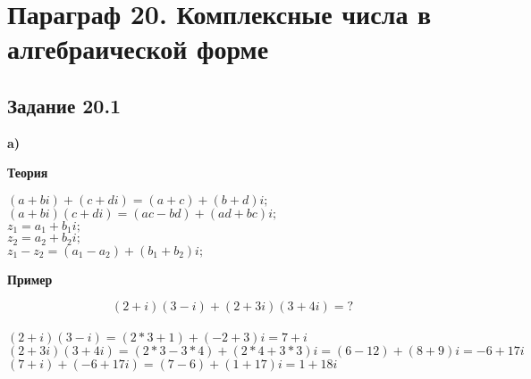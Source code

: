 \documentclass{article}
\begin{document}
\tableofcontents
\newpage
\section{Параграф 20. Комплексные числа в алгебраической форме}
\subsection{Задание 20.1}
\textbf{a)}\\
\begin{center}\textbf{Теория}\end{center}
$ (a+bi) + (c+di) = (a+c)+(b+d)i; $ \\
$ (a+bi)(c+di) = (ac-bd)+(ad+bc)i; $\\
$ z_1 = a_1+b_1i;$\\
$ z_2 = a_2+b_2i;$\\
$ z_1 - z_2 = (a_1-a_2)+(b_1+b_2)i; $
\begin{center}\textbf{Пример}\end{center}
$$(2+i)(3-i)+(2+3i)(3+4i) = ?$$\\
$(2+i)(3-i)=(2*3+1)+(-2+3)i = 7+i$\\
$(2+3i)(3+4i) =(2*3-3*4)+( 2* 4+3*3)i=(6-12)+(8+9)i=-6+17i$\\
$(7+i)+(-6+17i)=(7-6)+(1+17)i=1+18i$
\end{document}
